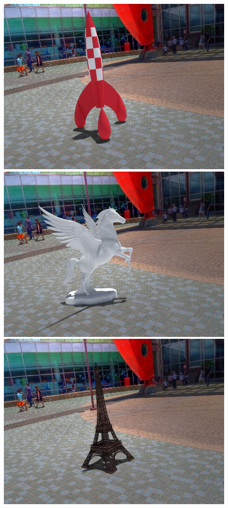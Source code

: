 \begin{multicols}{3}
\includegraphics[width=\linewidth]{virtual_object_insertions/pano_abpaafvavryivl-2_0_es.jpg}\vspace{1em}
\includegraphics[width=\linewidth]{virtual_object_insertions/pano_abpaafvavryivl-2_1_es.jpg}\vspace{1em}
\includegraphics[width=\linewidth]{virtual_object_insertions/pano_abpaafvavryivl-2_6_es.jpg}\vspace{1em}

\end{multicols}
